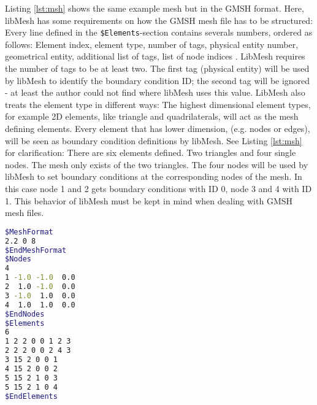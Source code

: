    Listing \ref{lst:msh} shows the same example mesh but in the GMSH format. Here, libMesh has some requirements on how the GMSH mesh file has to be structured: Every line defined in the \texttt{\$Elements}-section contains severals numbers, ordered as follows: Element index, element type, number of tags, physical entity number, geometrical entity, additional list of tags, list of node indices \cite{gmsh-manual}. LibMesh requires the number of tags to be at least two. The first tag (physical entity) will be used by libMesh to identify the boundary condition ID; the second tag will be ignored - at least the author could not find where libMesh uses this value. LibMesh also treats the element type in different ways: The highest dimensional element types, for example 2D elements, like triangle and quadrilaterals, will act as the mesh defining elements. Every element that has lower dimension, (e.g. nodes or edges), will be seen as boundary condition definitions by libMesh. See Listing \ref{lst:msh} for clarification: There are six elements defined. Two triangles and four single nodes. The mesh only exists of the two triangles. The four nodes will be used by libMesh to set boundary conditions at the corresponding nodes of the mesh. In this case node 1 and 2 gets boundary conditions with ID 0, node 3 and 4 with ID 1. This behavior of libMesh must be kept in mind when dealing with GMSH mesh files.
\begin{lstlisting}[caption=Example GMSH mesh file,label=lst:msh,language=bash,keepspaces=true]
$MeshFormat
2.2 0 8
$EndMeshFormat
$Nodes
4
1 -1.0 -1.0  0.0
2  1.0 -1.0  0.0
3 -1.0  1.0  0.0
4  1.0  1.0  0.0
$EndNodes
$Elements
6
1 2 2 0 0 1 2 3
2 2 2 0 0 2 4 3
3 15 2 0 0 1
4 15 2 0 0 2
5 15 2 1 0 3
5 15 2 1 0 4
$EndElements
\end{lstlisting}

